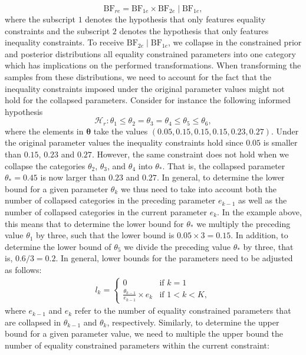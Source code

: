 \documentclass[
  english,
  man,floatsintext]{apa6}
\begin{document}
\begin{appendix}
\[
\text{BF}_{re}
= \text{BF}_{1e} \times \text{BF}_{2e} \mid \text{BF}_{1e},
\] where the subscript \(1\) denotes the hypothesis that only features
equality constraints and the subscript \(2\) denotes the hypothesis that
only features inequality constraints. To receive
\(\text{BF}_{2e} \mid \text{BF}_{1e}\), we collapse in the constrained
prior and posterior distributions all equality constrained parameters
into one category which has implications on the performed
transformations. When transforming the samples from these distributions,
we need to account for the fact that the inequality constraints imposed
under the original parameter values might not hold for the collapsed
parameters. Consider for instance the following informed hypothesis
\[\mathcal{H}_r: \theta_1 \leq \theta_2 = \theta_3 = \theta_4 \leq \theta_5 \leq \theta_6,\]
where the elements in \(\boldsymbol{\theta}\) take the values
\((0.05, 0.15, 0.15, 0.15, 0.23, 0.27)\). Under the original parameter
values the inequality constraints hold since \(0.05\) is smaller than
\(0.15\), \(0.23\) and \(0.27\). However, the same constraint does not
hold when we collapse the categories \(\theta_2\), \(\theta_3\), and
\(\theta_4\) into \(\theta_*\). That is, the collapsed parameter
\(\theta_* = 0.45\) is now larger than \(0.23\) and \(0.27\). In
general, to determine the lower bound for a given parameter \(\theta_k\)
we thus need to take into account both the number of collapsed
categories in the preceding parameter \(e_{k-1}\) as well as the number
of collapsed categories in the current parameter \(e_{k}\). In the
example above, this means that to determine the lower bound for
\(\theta_*\) we multiply the preceding value \(\theta_1\) by three, such
that the lower bound is \(0.05 \times 3 = 0.15\). In addition, to
determine the lower bound of \(\theta_5\) we divide the preceding value
\(\theta_*\) by three, that is, \(0.6/3 = 0.2\). In general, lower
bounds for the parameters need to be adjusted as follows: \begin{align}
l_k = \left.
\begin{cases}
0 & \text{if } k = 1 \\
\frac{\theta_{k - 1}}{e_{k-1}} \times e_k & \text{if } 1 < k < K,
\end{cases}
\right.
\end{align} where \(e_{k-1}\) and \(e_k\) refer to the number of
equality constrained parameters that are collapsed in \(\theta_{k - 1}\)
and \(\theta_{k}\), respectively. Similarly, to determine the upper
bound for a given parameter value, we need to multiple the upper bound
the number of equality constrained parameters within the current
constraint:


\end{appendix}
\end{document}
